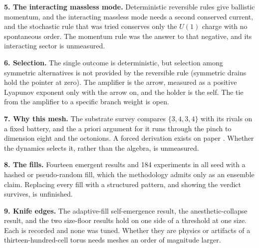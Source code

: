 \textbf{5. The interacting massless mode.} Deterministic reversible rules give ballistic momentum, and the interacting
massless mode needs a second conserved current, and the stochastic rule that was tried conserves only the $U(1)$
charge with no spontaneous order. The momentum rule was the answer to that negative, and its interacting sector is
unmeasured.

\textbf{6. Selection.} The single outcome is deterministic, but selection among symmetric alternatives is not
provided by the reversible rule (symmetric drains hold the pointer at zero). The amplifier is the arrow, measured as
a positive Lyapunov exponent only with the arrow on, and the holder is the self. The tie from the amplifier to a
specific branch weight is open.

\textbf{7. Why this mesh.} The substrate survey compares $\{3,4,3,4\}$ with its rivals on a fixed battery, and the
a priori argument for it runs through the pinch to dimension eight and the octonions. A forced derivation exists on
paper \cite{pollard2026nothing}. Whether the dynamics selects it, rather than the algebra, is unmeasured.

\textbf{8. The fills.} Fourteen emergent results and 184 experiments in all seed with a hashed or pseudo-random
fill, which the methodology admits only as an ensemble claim. Replacing every fill with a structured pattern, and
showing the verdict survives, is unfinished.

\textbf{9. Knife edges.} The adaptive-fill self-emergence result, the anesthetic-collapse result, and the two
size-floor results hold on one side of a threshold at one size. Each is recorded and none was tuned. Whether they
are physics or artifacts of a thirteen-hundred-cell torus needs meshes an order of magnitude larger.
